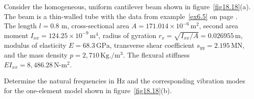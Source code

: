 \documentclass{AeroStructure-ERJohnson}
\begin{document}
\begin{example}\label{ex18.4}\setcounter{equation}{0}\def\theequation{\alph{equation}}Consider the homogeneous, uniform cantilever beam shown in figure~\ref{fig18.18}(a). The beam is a thin-walled tube with the data from example~\ref{ex6.5} on page \pageref{ex6.5}. The length $l = 0.8$ m, cross-sectional area $A=171.014 \times 10^{-6}\,\mathrm{m}^{2}$, second area moment $I_{x x}=124.25 \times 10^{-9}\,\mathrm{m}^{4}$, radius of gyration $r_{x}=\sqrt{I_{x x}/A}=0.026955\,\mathrm{m}$, modulus of elasticity $E=68.3\,\mathrm{GPa}$, transverse shear coefficient $s_{y y}=2.195\,\mathrm{MN}$, and the mass density $p=2{,}710\,\mathrm{Kg}./\mathrm{m}^{3}$. The flexural stiffness $E I_{x x}=8,486.28\,\mathrm{N}\mbox{-}\mathrm{m}^{2}$.

Determine the natural frequencies in Hz and the corresponding vibration modes for the one-element model shown in figure~\ref{fig18.18}(b).

{\def\thefigure{18.18}
}


\end{example}
\end{document}
